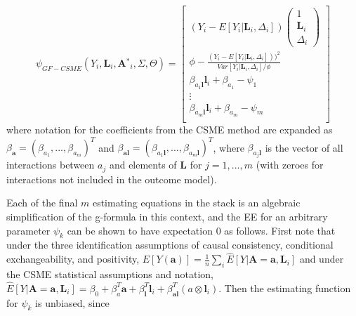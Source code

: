 \documentclass[12pt]{article}
\begin{document}
\begin{equation}
    \psi_{GF-CSME}(Y_{i}, \textbf{L}_{i}, \textbf{A$^{*}$}_{i}, \Sigma, \Theta) =
    \begin{bmatrix}
       (Y_{i} - E[Y_{i} | \textbf{L}_{i}, \Delta_{i}])
       \begin{pmatrix}
          1 \\
          \textbf{L}_{i} \\
          \Delta_{i}
       \end{pmatrix} \\
        \phi - \frac{(Y_{i} - E[Y_{i} | \textbf{L}_{i}, \Delta_{i}]))^{2}}{Var[Y_{i} | \textbf{L}_{i}, \Delta_{i}] / \phi} \\
        \beta_{a_{1}\textbf{l}}\textbf{l}_{i} + \beta_{a_{1}} - \psi_{1} \\
        \vdots \\
        \beta_{a_{m}\textbf{l}}\textbf{l}_{i} + \beta_{a_{m}} - \psi_{m} \\
    \end{bmatrix}
\end{equation}
where notation for the coefficients from the CSME method are expanded as $\beta_{\textbf{a}} = (\beta_{a_{1}},...,\beta_{a_{m}})^{T}$ and $\beta_{\textbf{al}} = (\beta_{a_{1}\textbf{l}}, ..., \beta_{a_{m}\textbf{l}})^{T}$, where $\beta_{a_{j}\textbf{l}}$ is the vector of all interactions between $a_{j}$ and elements of $\textbf{L}$ for $j = 1,...,m$ (with zeroes for interactions not included in the outcome model).

Each of the final $m$ estimating equations in the stack is an algebraic simplification of the g-formula in this context, and the EE for an arbitrary parameter $\psi_{k}$ can be shown to have expectation 0 as follows. First note that under the three identification assumptions of causal consistency, conditional exchangeability, and positivity, $E[Y(\textbf{a})] = \frac{1}{n}\sum_{i} \hat{E}[Y | \textbf{A} = \textbf{a}, \textbf{L}_{i}]$ and under the CSME statistical assumptions and notation, $\hat{E}[Y | \textbf{A} = \textbf{a}, \textbf{L}_{i}] = \beta_{0} + \beta_{a}^{T}\textbf{a} + \beta_{\textbf{l}}^{T}\textbf{l}_{i} + \beta_{\textbf{al}}^{T}(a \otimes \textbf{l}_{i})$. Then the estimating function for $\psi_{k}$ is unbiased, since
\end{document}
